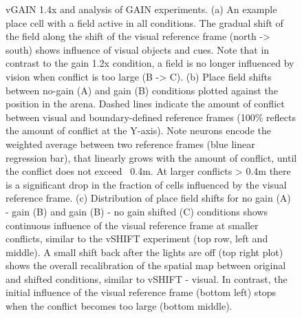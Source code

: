 \begin{figure}
\captionsetup{format=plain}
\caption[Sensory alternation in gradual mismatch in vGAIN 1.4x]{
vGAIN 1.4x and analysis of GAIN experiments. (a) An example place cell with a field active in all conditions. The gradual shift of the field along the shift of the visual reference frame (north -> south) shows influence of visual objects and cues. Note that in contrast to the gain 1.2x condition, a field is no longer influenced by vision when conflict is too large (B -> C). (b) Place field shifts between no-gain (A) and gain (B) conditions plotted against  the position in the arena. Dashed lines indicate the amount of conflict between visual and boundary-defined reference frames (100\% reflects the amount of conflict at the Y-axis). Note neurons encode the weighted average between two reference frames (blue linear regression bar), that linearly grows with the amount of conflict, until the conflict does not exceed ~0.4m. At larger conflicts > 0.4m there is a significant drop in the fraction of cells influenced by the visual reference frame. (c) Distribution of place field shifts for no gain (A) - gain (B) and gain (B) - no gain shifted (C) conditions shows continuous influence of the visual reference frame at smaller conflicts, similar to the vSHIFT experiment (top row, left and middle). A small shift back after the lights are off (top right plot) shows the overall recalibration of the spatial map between original and shifted conditions, similar to vSHIFT - visual. In contrast, the initial influence of the visual reference frame (bottom left) stops when the conflict becomes too large (bottom middle).
}
\label{fig:F28_gain_14x}
\end{figure}

